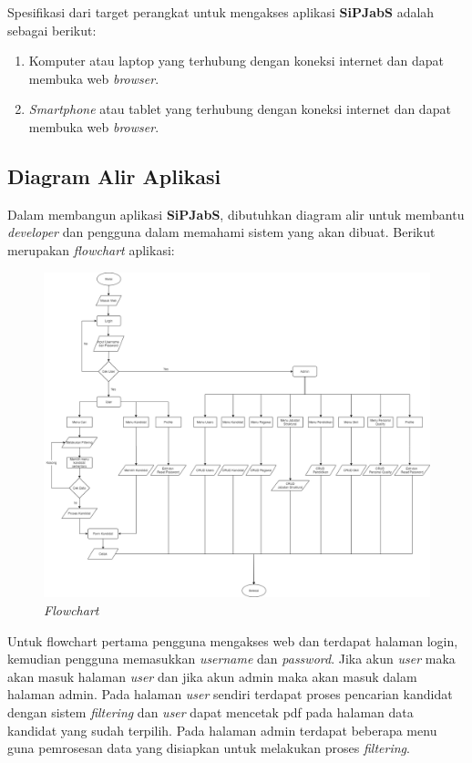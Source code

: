 Spesifikasi dari target perangkat untuk mengakses aplikasi \textbf{SiPJabS} adalah sebagai berikut: 

\begin{enumerate}

\item Komputer atau laptop yang terhubung dengan koneksi internet dan dapat membuka web \textit{browser}.

\item	\textit{Smartphone} atau tablet yang terhubung dengan koneksi internet dan dapat membuka web \textit{browser}.
\end{enumerate}

\subsection{Diagram Alir Aplikasi}

Dalam membangun aplikasi \textbf{SiPJabS}, dibutuhkan diagram alir untuk membantu \textit{developer} dan pengguna dalam memahami sistem yang akan dibuat. Berikut merupakan \textit{flowchart} aplikasi:

\begin{figure}
	\centering
	\includegraphics[width=1\textwidth]
	{pics/diagram/flowchart.png}
	\caption{\textit{Flowchart}}
	\label{fig:31}
\end{figure}

Untuk flowchart pertama pengguna mengakses web dan terdapat halaman login, kemudian pengguna memasukkan \textit{username} dan \textit{password}. Jika akun \textit{user} maka akan masuk halaman \textit{user} dan jika akun admin maka akan masuk dalam halaman admin. Pada halaman \textit{user} sendiri terdapat proses pencarian kandidat dengan sistem \textit{filtering} dan \textit{user} dapat mencetak pdf pada halaman data kandidat yang sudah terpilih. Pada halaman admin terdapat beberapa menu guna  pemrosesan data yang disiapkan untuk melakukan proses \textit{filtering}.

